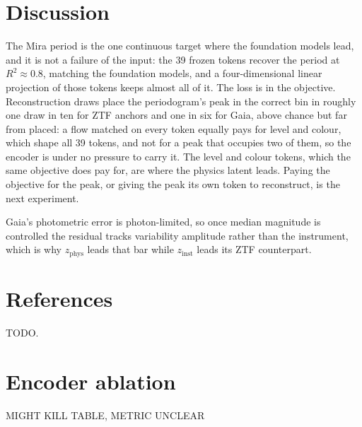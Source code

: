\documentclass{article}
\newcommand{\zphys}{z_{\mathrm{phys}}}
\newcommand{\zinst}{z_{\mathrm{inst}}}
\begin{document}
\section{Discussion}
The Mira period is the one continuous target where the foundation models lead, and it is not a failure of the input: the 39 frozen tokens recover the period at $R^2\approx0.8$, matching the foundation models, and a four-dimensional linear projection of those tokens keeps almost all of it.
The loss is in the objective. Reconstruction draws place the periodogram's peak in the correct bin in roughly one draw in ten for ZTF anchors and one in six for Gaia, above chance but far from placed: a flow matched on every token equally pays for level and colour, which shape all 39 tokens, and not for a peak that occupies two of them, so the encoder is under no pressure to carry it.
The level and colour tokens, which the same objective does pay for, are where the physics latent leads.
Paying the objective for the peak, or giving the peak its own token to reconstruct, is the next experiment.

Gaia's photometric error is photon-limited, so once median magnitude is
controlled the residual tracks variability amplitude rather than the
instrument, which is why $\zphys$ leads that bar while $\zinst$ leads its ZTF
counterpart.

\section*{References}
{\small
TODO.
}

\appendix
\section{Encoder ablation}
MIGHT KILL TABLE, METRIC UNCLEAR
\end{document}
